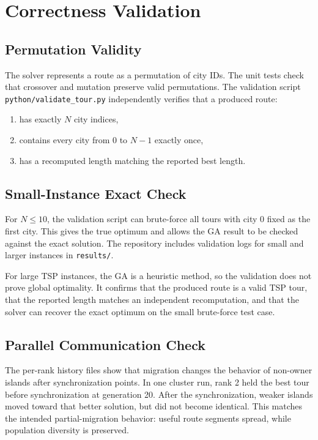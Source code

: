 \documentclass[11pt,a4paper]{article}
\begin{document}
\section{Correctness Validation}

\subsection{Permutation Validity}
The solver represents a route as a permutation of city IDs. The unit tests check
that crossover and mutation preserve valid permutations. The validation script
\texttt{python/validate\_tour.py} independently verifies that a produced route:

\begin{enumerate}[leftmargin=*]
  \item has exactly $N$ city indices,
  \item contains every city from $0$ to $N-1$ exactly once,
  \item has a recomputed length matching the reported best length.
\end{enumerate}

\subsection{Small-Instance Exact Check}
For $N \le 10$, the validation script can brute-force all tours with city 0 fixed
as the first city. This gives the true optimum and allows the GA result to be
checked against the exact solution. The repository includes validation logs for
small and larger instances in \texttt{results/}.

For large TSP instances, the GA is a heuristic method, so the validation does
not prove global optimality. It confirms that the produced route is a valid TSP
tour, that the reported length matches an independent recomputation, and that
the solver can recover the exact optimum on the small brute-force test case.

\subsection{Parallel Communication Check}
The per-rank history files show that migration changes the behavior of non-owner
islands after synchronization points. In one cluster run, rank 2 held the best
tour before synchronization at generation 20. After the synchronization, weaker
islands moved toward that better solution, but did not become identical. This
matches the intended partial-migration behavior: useful route segments spread,
while population diversity is preserved.
\end{document}
